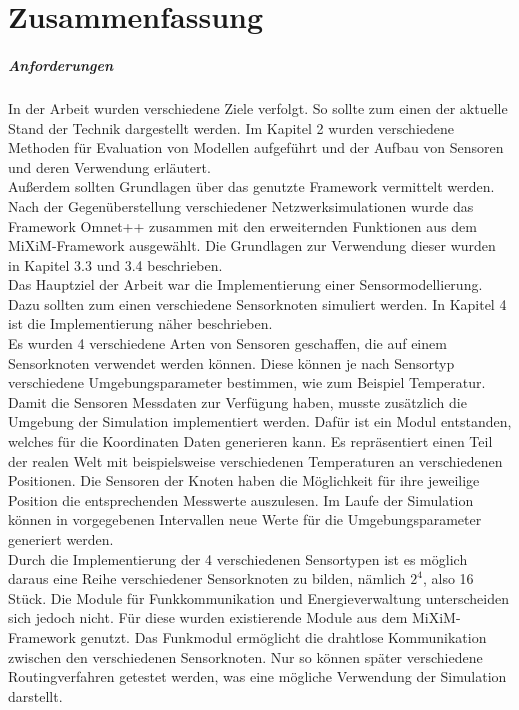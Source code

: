 \chapter{Zusammenfassung}

\paragraph{Anforderungen} In der Arbeit wurden verschiedene Ziele verfolgt. So sollte zum einen der aktuelle Stand der Technik dargestellt werden. Im Kapitel 2 wurden verschiedene Methoden für Evaluation von Modellen aufgeführt und der Aufbau von Sensoren und deren Verwendung erläutert.\\
Außerdem sollten Grundlagen über das genutzte Framework vermittelt werden. Nach der Gegenüberstellung verschiedener Netzwerksimulationen wurde das Framework Omnet++ zusammen mit den erweiternden Funktionen aus dem MiXiM-Framework ausgewählt. Die Grundlagen zur Verwendung dieser wurden in Kapitel 3.3 und 3.4 beschrieben.\\
Das Hauptziel der Arbeit war die Implementierung einer Sensormodellierung. Dazu sollten zum einen verschiedene Sensorknoten simuliert werden. In Kapitel 4 ist die Implementierung näher beschrieben. \\
Es wurden 4 verschiedene Arten von Sensoren geschaffen, die auf einem Sensorknoten verwendet werden können. Diese können je nach Sensortyp verschiedene Umgebungsparameter bestimmen, wie zum Beispiel Temperatur. Damit die Sensoren Messdaten zur Verfügung haben, musste zusätzlich die Umgebung der Simulation implementiert werden. Dafür ist ein Modul entstanden, welches für die Koordinaten Daten generieren kann. Es repräsentiert einen Teil der realen Welt mit beispielsweise verschiedenen Temperaturen an verschiedenen Positionen. Die Sensoren der Knoten haben die Möglichkeit für ihre jeweilige Position die entsprechenden Messwerte auszulesen. Im Laufe der Simulation können in vorgegebenen Intervallen neue Werte für die Umgebungsparameter generiert werden.\\
Durch die Implementierung der 4 verschiedenen Sensortypen ist es möglich daraus eine Reihe verschiedener Sensorknoten zu bilden, nämlich $2^4$, also 16 Stück. Die Module für Funkkommunikation und Energieverwaltung unterscheiden sich jedoch nicht. Für diese wurden existierende Module aus dem MiXiM-Framework genutzt. Das Funkmodul ermöglicht die drahtlose Kommunikation zwischen den verschiedenen Sensorknoten. Nur so können später verschiedene Routingverfahren getestet werden, was eine mögliche Verwendung der Simulation darstellt.\\
